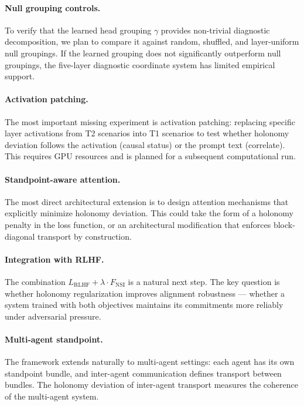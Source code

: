 \paragraph{Null grouping controls.}
To verify that the learned head grouping $\gamma$ provides non-trivial diagnostic
decomposition, we plan to compare it against random, shuffled, and layer-uniform null
groupings. If the learned grouping does not significantly outperform null groupings, the
five-layer diagnostic coordinate system has limited empirical support.

\paragraph{Activation patching.}
The most important missing experiment is activation patching: replacing specific layer
activations from T2 scenarios into T1 scenarios to test whether holonomy deviation follows
the activation (causal status) or the prompt text (correlate). This requires GPU resources
and is planned for a subsequent computational run.

\paragraph{Standpoint-aware attention.}
The most direct architectural extension is to design attention mechanisms that explicitly
minimize holonomy deviation. This could take the form of a holonomy penalty in the loss
function, or an architectural modification that enforces block-diagonal transport by
construction.

\paragraph{Integration with RLHF.}
The combination $L_{\mathrm{RLHF}} + \lambda \cdot F_{\mathrm{NSI}}$ is a natural next
step. The key question is whether holonomy regularization improves alignment robustness
--- whether a system trained with both objectives maintains its commitments more
reliably under adversarial pressure.

\paragraph{Multi-agent standpoint.}
The framework extends naturally to multi-agent settings: each agent has its own standpoint
bundle, and inter-agent communication defines transport between bundles. The holonomy
deviation of inter-agent transport measures the coherence of the multi-agent system.
